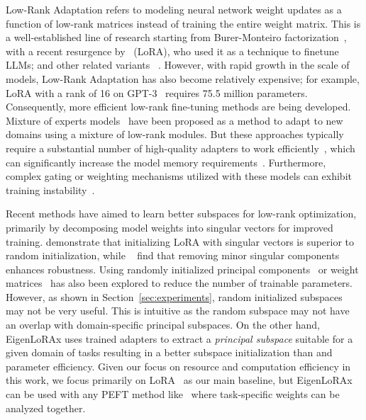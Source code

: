 Low-Rank Adaptation refers to modeling neural network weight updates as a function of low-rank matrices instead of training the entire weight matrix.
This is a well-established line of research starting from Burer-Monteiro factorization~\citep{Burer2003ANP}, with a recent resurgence by~\citet{hu2021lora} (LoRA), who used it as a technique to finetune LLMs; and other related variants ~\citep{Ma2024, chi19_low, kwon2024efficientcompressionoverparameterizeddeep}. 
However, with rapid growth in the scale of models, Low-Rank Adaptation has also become relatively expensive; for example, LoRA with a rank of 16 on GPT-3~\cite{browngpt3} requires 75.5 million parameters. Consequently, more efficient low-rank fine-tuning methods are being developed. Mixture of experts models~\citep{huang2023lorahub, wu2024mixture, diao_mixture--domain-adapters_2023, zhong2024multi, zhou2018x} have been proposed as a method to adapt to new domains using a mixture of low-rank modules. But these approaches typically require a substantial number of high-quality adapters to work efficiently~\citep{acl-2024-long}, which can significantly increase the model memory requirements~\citep{zhou2022mixtureofexperts}. Furthermore, complex gating or weighting mechanisms utilized with these models can exhibit training instability~\citep{zoph2022stmoedesigningstabletransferable}. 

Recent methods have aimed to learn better subspaces for low-rank optimization, primarily by decomposing model weights into singular vectors for improved training. \citet{meng_pissa_2024} demonstrate that initializing LoRA with singular vectors is superior to random initialization, while ~\citet{sharma_laser_2023} find that removing minor singular components enhances robustness. Using randomly initialized principal components~\citep{kopiczko_vera_2023} or weight matrices~\citep{nola} has also been explored to reduce the number of trainable parameters. However, as shown in Section~\ref{sec:experiments}, random initialized subspaces may not be very useful. This is intuitive as the random subspace may not have an overlap with domain-specific principal subspaces. On the other hand, EigenLoRAx uses trained adapters to extract a \textit{principal subspace} suitable for a given domain of tasks resulting in a better subspace initialization than and parameter efficiency. 
Given our focus on resource and computation efficiency in this work, we focus primarily on LoRA~\citep{hu2021lora} as our main baseline, but EigenLoRAx can be used with any PEFT method like~\cite{dora, zhang2023adaloraadaptivebudgetallocation} where task-specific weights can be analyzed together. 